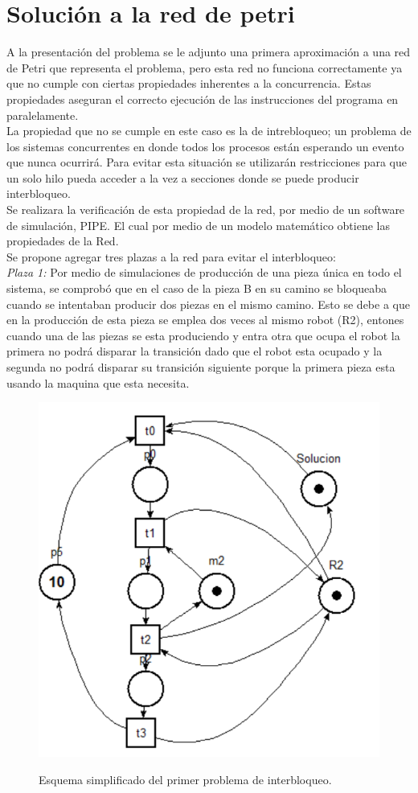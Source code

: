\documentclass[10pt, a4paper,notitlepage]{article}
\begin{document}
\section{Solución a la red de petri}
A la presentación del problema se le adjunto una primera aproximación a una red de Petri que representa el problema, pero esta red no funciona correctamente ya que no cumple con ciertas propiedades inherentes a la concurrencia. Estas propiedades aseguran el correcto ejecución de las instrucciones del programa en paralelamente.\\
La propiedad que no se cumple en este caso es la de intrebloqueo; un problema de los sistemas concurrentes en donde todos los procesos están esperando un evento que nunca ocurrirá. Para evitar esta situación se utilizarán restricciones para que un solo hilo pueda acceder a la vez a secciones donde se puede producir interbloqueo.
\\
Se realizara la verificación de esta propiedad de la red, por medio de un software de simulación, PIPE. El cual por medio de un modelo matemático obtiene las propiedades de la Red.\\
Se propone agregar tres plazas a la red para evitar el interbloqueo:
\\
\textit{Plaza 1:}
Por medio de simulaciones de producción de una pieza única en todo el sistema, se comprobó que en el caso de la pieza B en su camino se bloqueaba cuando se intentaban producir dos piezas en el mismo camino. Esto se debe a que en la producción de esta pieza se emplea dos veces al mismo robot (R2), entones cuando una de las piezas se esta produciendo y entra otra que ocupa el robot la primera no podrá disparar la transición dado que el robot esta ocupado y la segunda no podrá disparar su transición siguiente porque la primera pieza esta usando la maquina que esta necesita.


\begin{figure}[H] %
	{\includegraphics[width=0.4\linewidth]{./figure/I11}}
	\caption{Esquema simplificado del primer problema de interbloqueo.}
	\label{fig:I10}
\end{figure}
\end{document}
